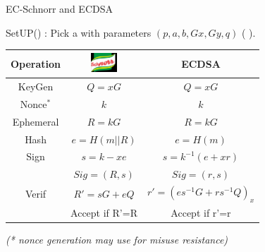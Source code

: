 \documentclass[aspectratio=43]{beamer}
\begin{document}
\begin{frame}{EC-Schnorr and ECDSA}

SetUP() : Pick a \href{https://github.com/LedgerHQ/speculos/blob/master/src/bolos/cx_ec_domain.c}{} with parameters $(p,a,b,Gx,Gy,q)$ (\href{https://hyperelliptic.org/EFD/g1p/auto-shortw.html}{} ).

  \begin{center}
\begin{tabular}{|c|c |c|}
\hline
Operation&\includegraphics[width=1cm]{images/schnorr.jpg} & ECDSA \\
\hline
KeyGen &$Q=xG$        &$Q=xG$ \\

Nonce$^*$&$k$	&  $k$ \\
Ephemeral&$R=kG$    &$R=kG$  \\
\hline

Hash &$e=H(m||R)$ & $e=H(m)$\\
\hline

Sign &$s=k-xe$    & $s=k^{-1}(e+xr)$  \\
     & $Sig=(R,s)$ & $Sig=(r,s)$ \\	
\hline
Verif &   $R'=sG+eQ$& $r'=(es^{-1}G+rs^{-1}Q)_x $ \\    
      & Accept if R'=R & Accept if r'=r \\
\hline
\end{tabular}  
 \end{center}
 
 
 \begin{center}
 \begin{small}
 {\emph{
 (* nonce generation may use \href{https://www.rfc-editor.org/rfc/rfc6979}{} for misuse resistance)}}
 \end{small}
\end{center}

\end{frame} 
 

\end{document}
